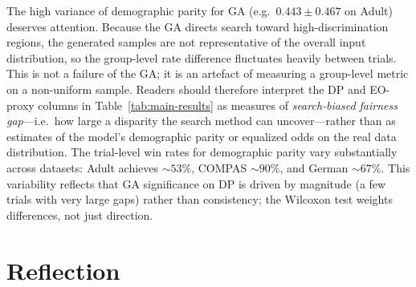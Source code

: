 \documentclass[10pt]{article}
\begin{document}
The high variance of demographic parity for GA (e.g.\ $0.443 \pm 0.467$ on Adult)
deserves attention.  Because the GA directs search toward high-discrimination regions, the
generated samples are not representative of the overall input distribution, so the
group-level rate difference fluctuates heavily between trials.  This is not a failure of
the GA; it is an artefact of measuring a group-level metric on a non-uniform sample.
Readers should therefore interpret the DP and EO-proxy columns in Table~\ref{tab:main-results}
as measures of \emph{search-biased fairness gap}---i.e.\ how large a disparity the search
method can uncover---rather than as estimates of the model's demographic parity or
equalized odds on the real data distribution.
The trial-level win rates for demographic parity vary substantially across datasets:
Adult achieves ${\sim}53\%$, COMPAS ${\sim}90\%$, and German ${\sim}67\%$.  This
variability reflects that GA significance on DP is driven by magnitude (a few trials
with very large gaps) rather than consistency; the Wilcoxon test weights differences,
not just direction.

\section{Reflection}
\end{document}
